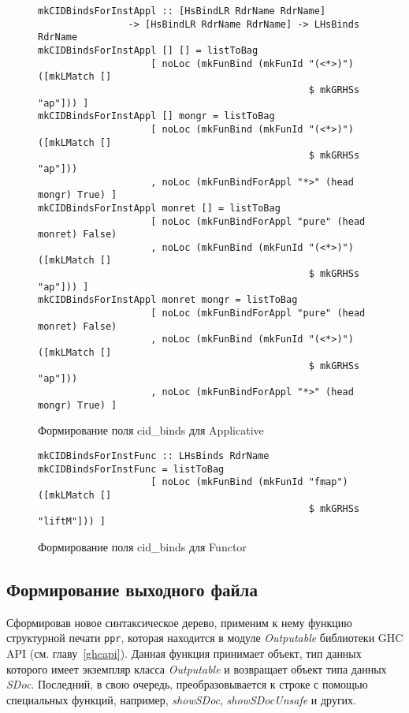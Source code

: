 \begin{figure}[h]
\hrulefill
\begin{lstlisting}
mkCIDBindsForInstAppl :: [HsBindLR RdrName RdrName]
                -> [HsBindLR RdrName RdrName] -> LHsBinds RdrName
mkCIDBindsForInstAppl [] [] = listToBag 
                    [ noLoc (mkFunBind (mkFunId "(<*>)") ([mkLMatch [] 
                                                $ mkGRHSs "ap"])) ]
mkCIDBindsForInstAppl [] mongr = listToBag
                    [ noLoc (mkFunBind (mkFunId "(<*>)") ([mkLMatch [] 
                                                $ mkGRHSs "ap"]))
                    , noLoc (mkFunBindForAppl "*>" (head mongr) True) ]
mkCIDBindsForInstAppl monret [] = listToBag
                    [ noLoc (mkFunBindForAppl "pure" (head monret) False)
                    , noLoc (mkFunBind (mkFunId "(<*>)") ([mkLMatch [] 
                                                $ mkGRHSs "ap"])) ]
mkCIDBindsForInstAppl monret mongr = listToBag
                    [ noLoc (mkFunBindForAppl "pure" (head monret) False)
                    , noLoc (mkFunBind (mkFunId "(<*>)") ([mkLMatch [] 
                                                $ mkGRHSs "ap"]))
                    , noLoc (mkFunBindForAppl "*>" (head mongr) True) ]
\end{lstlisting}
\hrulefill
\caption{Формирование поля cid\_binds для Applicative}\label{cidbindsappl}
\end{figure}

\begin{figure}[h]
\hrulefill
\begin{lstlisting}
mkCIDBindsForInstFunc :: LHsBinds RdrName
mkCIDBindsForInstFunc = listToBag
                    [ noLoc (mkFunBind (mkFunId "fmap") ([mkLMatch [] 
                                                $ mkGRHSs "liftM"])) ]
\end{lstlisting}
\hrulefill
\caption{Формирование поля cid\_binds для Functor}\label{cidbindsfunc}
\end{figure}
\subsection{Формирование выходного файла}
Сформировав новое синтаксическое дерево, применим к нему функцию структурной печати \lstinline{ppr}, которая находится в модуле \textit{Outputable} библиотеки GHC API (см. главу~\ref{ghcapi}). Данная функция принимает объект, тип данных которого имеет экземпляр класса \textit{Outputable} и возвращает объект типа данных \textit{SDoc}. Последний, в свою очередь, преобразовывается к строке с помощью специальных функций, например, \textit{showSDoc}, \textit{showSDocUnsafe} и других.

